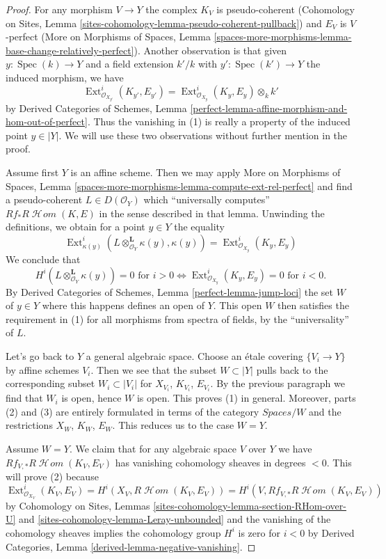 \documentclass[10pt,a4paper]{amsart}
\theoremstyle{plain}
\theoremstyle{definition}
\theoremstyle{remark}
\numberwithin{equation}{subsection}
\def\Spec{\mathop{\mathrm{Spec}}}
\def\Ext{\mathop{\mathrm{Ext}}\nolimits}
\def\SheafHom{\mathop{\mathcal{H}\!\mathit{om}}\nolimits}
\begin{document}
\begin{proof}
For any morphism $V \to Y$ the complex $K_V$ is pseudo-coherent
(Cohomology on Sites, Lemma
\ref{sites-cohomology-lemma-pseudo-coherent-pullback})
and $E_V$ is $V$-perfect (More on Morphisms of Spaces, Lemma
\ref{spaces-more-morphisms-lemma-base-change-relatively-perfect}).
Another observation is that given $y : \Spec(k) \to Y$
and a field extension $k'/k$ with $y' : \Spec(k') \to Y$
the induced morphism, we have
$$
\Ext^i_{\mathcal{O}_{X_{y'}}}(K_{y'}, E_{y'}) =
\Ext^i_{\mathcal{O}_{X_y}}(K_y, E_y) \otimes_k k'
$$
by Derived Categories of Schemes, Lemma
\ref{perfect-lemma-affine-morphism-and-hom-out-of-perfect}.
Thus the vanishing in (1) is really a property of the induced
point $y \in |Y|$.
We will use these two observations without further mention in the proof.

\medskip\noindent
Assume first $Y$ is an affine scheme. Then we may apply
More on Morphisms of Spaces, Lemma
\ref{spaces-more-morphisms-lemma-compute-ext-rel-perfect}
and find a pseudo-coherent $L \in D(\mathcal{O}_Y)$ which
``universally computes'' $Rf_*R\SheafHom(K, E)$ in the sense
described in that lemma. Unwinding the definitions, we obtain
for a point $y \in Y$ the equality
$$
\Ext^i_{\kappa(y)}(L \otimes_{\mathcal{O}_Y}^\mathbf{L} \kappa(y),
\kappa(y)) = \Ext^i_{\mathcal{O}_{X_y}}(K_y, E_y)
$$
We conclude that
$$
H^i(L \otimes_{\mathcal{O}_Y}^\mathbf{L} \kappa(y)) = 0
\text{ for } i > 0 \Leftrightarrow
\Ext^i_{\mathcal{O}_{X_y}}(K_y, E_y) = 0 \text{ for }i < 0.
$$
By Derived Categories of Schemes, Lemma \ref{perfect-lemma-jump-loci}
the set $W$ of $y \in Y$ where this happens defines an open of $Y$.
This open $W$ then satisfies the requirement in (1) for all morphisms
from spectra of fields, by the ``universality'' of $L$.

\medskip\noindent
Let's go back to $Y$ a general algebraic space.
Choose an \'etale covering $\{V_i \to Y\}$ by affine schemes $V_i$.
Then we see that the subset $W \subset |Y|$ pulls back to the corresponding
subset $W_i \subset |V_i|$ for $X_{V_i}$, $K_{V_i}$, $E_{V_i}$.
By the previous paragraph we find that $W_i$ is open, hence $W$ is open.
This proves (1) in general. Moreover, parts (2) and (3) are entirely formulated
in terms of the category $\textit{Spaces}/W$ and the restrictions
$X_W$, $K_W$, $E_W$. This reduces us to the case $W = Y$.

\medskip\noindent
Assume $W = Y$. We claim that for any algebraic space $V$ over $Y$
we have $Rf_{V, *}R\SheafHom(K_V, E_V)$ has vanishing cohomology
sheaves in degrees $< 0$. This will prove (2) because
$$
\Ext^i_{\mathcal{O}_{X_V}}(K_V, E_V) =
H^i(X_V, R\SheafHom(K_V, E_V)) = 
H^i(V, Rf_{V, *}R\SheafHom(K_V, E_V))
$$
by Cohomology on Sites, Lemmas
\ref{sites-cohomology-lemma-section-RHom-over-U} and
\ref{sites-cohomology-lemma-Leray-unbounded}
and the vanishing of the cohomology sheaves implies the
cohomology group $H^i$ is zero for $i < 0$ by
Derived Categories, Lemma \ref{derived-lemma-negative-vanishing}.


\end{proof}
\end{document}

